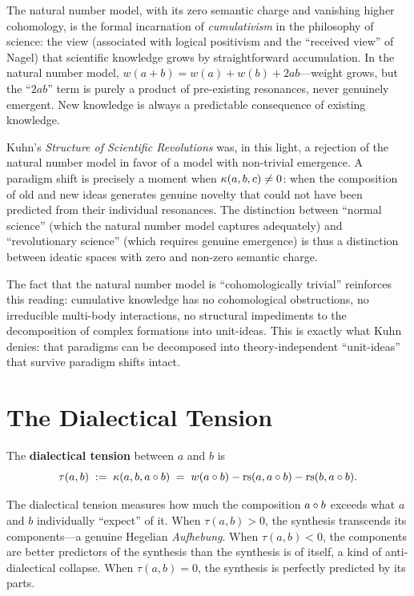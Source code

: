 \begin{interpretation}\label{interp:ch3:natural_number_cumulativism}
The natural number model, with its zero semantic charge and vanishing
higher cohomology, is the formal incarnation of \emph{cumulativism}
in the philosophy of science: the view (associated with logical
positivism and the ``received view'' of Nagel) that scientific knowledge
grows by straightforward accumulation. In the natural number model,
$w(a + b) = w(a) + w(b) + 2ab$---weight grows, but the ``$2ab$'' term
is purely a product of pre-existing resonances, never genuinely emergent.
New knowledge is always a predictable consequence of existing knowledge.

Kuhn's \emph{Structure of Scientific Revolutions} was, in this light,
a rejection of the natural number model in favor of a model with
non-trivial emergence. A paradigm shift is precisely a moment when
$\kappa(a, b, c) \neq 0$: when the composition of old and new ideas
generates genuine novelty that could not have been predicted from their
individual resonances. The distinction between ``normal science''
(which the natural number model captures adequately) and ``revolutionary
science'' (which requires genuine emergence) is thus a distinction between
ideatic spaces with zero and non-zero semantic charge.

The fact that the natural number model is ``cohomologically trivial''
reinforces this reading: cumulative knowledge has no cohomological
obstructions, no irreducible multi-body interactions, no structural
impediments to the decomposition of complex formations into unit-ideas.
This is exactly what Kuhn denies: that paradigms can be decomposed
into theory-independent ``unit-ideas'' that survive paradigm shifts
intact.
\end{interpretation}

\section{The Dialectical Tension}

\begin{definition}\label{def:dialectical-tension}
The \textbf{dialectical tension} between $a$ and $b$ is
\[
    \tau(a, b) \;:=\; \kappa(a, b, a \circ b)
    \;=\; w(a \circ b) - \mathrm{rs}(a, a \circ b) - \mathrm{rs}(b, a \circ b).
\]
\end{definition}

\begin{interpretation}
The dialectical tension measures how much the composition $a \circ b$
exceeds what $a$ and $b$ individually ``expect'' of it. When
$\tau(a,b) > 0$, the synthesis transcends its components---a genuine
Hegelian \emph{Aufhebung}. When $\tau(a,b) < 0$, the components are
better predictors of the synthesis than the synthesis is of itself, a
kind of anti-dialectical collapse. When $\tau(a,b) = 0$, the synthesis
is perfectly predicted by its parts.
\end{interpretation}

